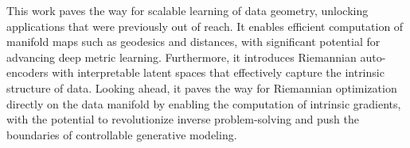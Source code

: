 This work paves the way for scalable learning of data geometry, unlocking applications that were previously out of reach. It enables efficient computation of manifold maps such as geodesics and distances, with significant potential for advancing deep metric learning. Furthermore, it introduces Riemannian auto-encoders with interpretable latent spaces that effectively capture the intrinsic structure of data. Looking ahead, it paves the way for Riemannian optimization directly on the data manifold by enabling the computation of intrinsic gradients, with the potential to revolutionize inverse problem-solving and push the boundaries of controllable generative modeling.
